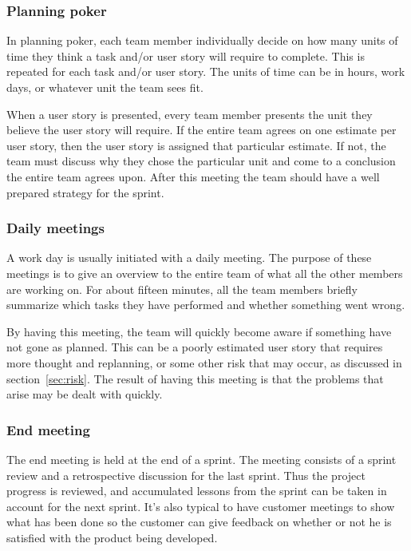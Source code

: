 \subsubsection{Planning poker}
In planning poker, each team member individually decide on how many units of time they think a task and/or user story will require to complete. This is repeated for each task and/or user story. The units of time can be in hours, work days, or whatever unit the team sees fit.

When a user story is presented, every team member presents the unit they believe the user story will require. If the entire team agrees on one estimate per user story, then the user story is assigned that particular estimate. If not, the team must discuss why they chose the particular unit and come to a conclusion the entire team agrees upon.
After this meeting the team should have a well prepared strategy for the sprint.

\subsubsection{Daily meetings}
A work day is usually initiated with a daily meeting. The purpose of these meetings is to give an overview to the entire team of what all the other members are working on. For about fifteen minutes, all the team members briefly summarize which tasks they have performed and whether something went wrong.

By having this meeting, the team will quickly become aware if something have not gone as planned. This can be a poorly estimated user story that requires more thought and replanning, or some other risk that may occur, as discussed in section~\ref{sec:risk}. The result of having this meeting is that the problems that arise may be dealt with quickly.

\subsubsection{End meeting}
The end meeting is held at the end of a sprint. The meeting consists of a sprint review and a retrospective discussion for the last sprint.
Thus the project progress is reviewed, and accumulated lessons from the sprint can be taken in account for the next sprint.
It's also typical to have customer meetings to show what has been done so the customer can give feedback on whether or not he is satisfied with the product being developed.

